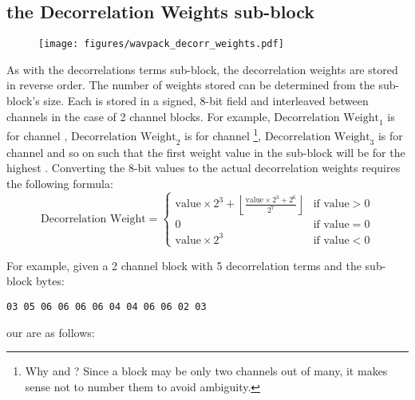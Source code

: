 \clearpage

\subsection{the Decorrelation Weights sub-block}
\begin{figure}[h]
\texttt{[image: figures/wavpack\_decorr\_weights.pdf]}
\end{figure}
\par
\noindent
As with the decorrelations terms sub-block,
the decorrelation weights are stored in reverse order.
The number of weights stored can be determined from the sub-block's
size.
Each is stored in a signed, 8-bit field and interleaved between
channels in the case of 2 channel blocks.
For example, $\text{Decorrelation Weight}_1$ is for channel ,
$\text{Decorrelation Weight}_2$ is for channel
\footnote{Why  and ?
Since a block may be only two channels out of many,
it makes sense not to number them to avoid ambiguity.},
$\text{Decorrelation Weight}_3$ is for channel  and so on
such that the first weight value in the sub-block will be for the highest
.
Converting the 8-bit values to the actual decorrelation weights
requires the following formula:
\begin{equation*}
\text{Decorrelation Weight} =
\begin{cases}
\text{value} \times 2 ^ 3 + \left\lfloor\frac{\text{value} \times 2 ^ 3 + 2 ^ 6}{2 ^ 7}\right\rfloor & \text{if value} > 0 \\
0 & \text{if value} = 0 \\
\text{value} \times 2 ^ 3 & \text{if value} < 0
\end{cases}
\end{equation*}
\par
\noindent
For example, given a 2 channel block with 5 decorrelation terms and the
sub-block bytes:
\begin{Verbatim}[frame=single]
03 05 06 06 06 06 04 04 06 06 02 03
\end{Verbatim}
our  are as follows:
